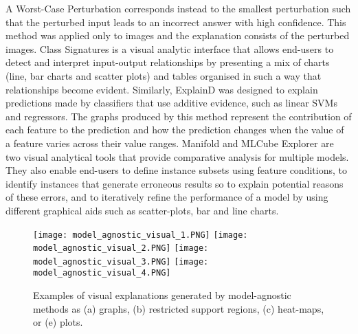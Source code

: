 \documentclass[final,1p,times]{elsarticle}
\begin{document}
A Worst-Case Perturbation \cite{goodfellow2015explaining} corresponds instead to the smallest perturbation such that the perturbed input leads to an incorrect answer with high confidence. This method was applied only to images and the explanation consists of the perturbed images.
Class Signatures \cite{krause2016using} is a visual analytic interface that allows end-users to detect and interpret input-output relationships by presenting a mix of charts (line, bar charts and scatter plots) and tables organised in such a way that relationships become evident. Similarly, ExplainD \cite{poulin2006visual} was designed to explain predictions made by classifiers that use additive evidence, such as linear SVMs and regressors. The graphs produced by this method represent the contribution of each feature to the prediction and how the prediction changes when the value of a feature varies across their value ranges. 
Manifold \cite{zhang2019manifold} and MLCube Explorer \cite{kahng2016visual} are two visual analytical tools that provide comparative analysis for multiple models. They also enable end-users to define instance subsets using feature conditions, to identify instances that generate erroneous results so to explain potential reasons of these errors, and to iteratively refine the performance of a model by using different graphical aids such as scatter-plots, bar and line charts.\\

\begin{figure}[!ht]
\begin{minipage}{\textwidth}
\centering
    {\texttt{[image: model\_agnostic\_visual\_1.PNG]}}
    {\texttt{[image: model\_agnostic\_visual\_2.PNG]}}
    {\texttt{[image: model\_agnostic\_visual\_3.PNG]}}
    {\texttt{[image: model\_agnostic\_visual\_4.PNG]}}
  \caption{Examples of visual explanations generated by model-agnostic methods as (a) graphs, (b) restricted support regions, (c) heat-maps, or (e) plots.}
  \label{fig:model_agnostic_visual}
\end{minipage}
\end{figure}
\end{document}
